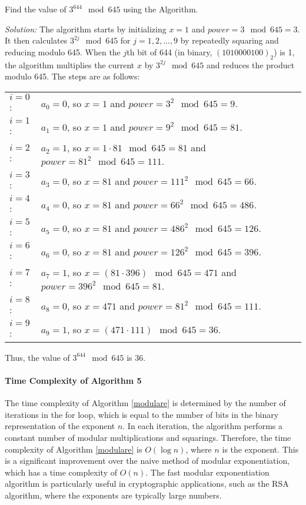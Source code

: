     \begin{example}
        Find the value of $3^{644} \mod 645$ using the Algorithm.
        
        \textit{Solution:} The algorithm starts by initializing $x = 1$ and $power = 3 \mod 645 = 3$. It then calculates
        $3^{2j} \mod 645$ for $j = 1, 2, \ldots, 9$ by repeatedly squaring and reducing modulo 645. When the $j$th bit of 644 
        (in binary, $(1010000100)_2$) is 1, the algorithm multiplies the current $x$ by $3^{2j} \mod 645$ and reduces the product modulo 645. The steps are as follows:
        
        \begin{tabular}{ll}
        $i = 0$: & $a_0 = 0$, so $x = 1$ and $power = 3^2 \mod 645 = 9$. \\
        $i = 1$: & $a_1 = 0$, so $x = 1$ and $power = 9^2 \mod 645 = 81$. \\
        $i = 2$: & $a_2 = 1$, so $x = 1 \cdot 81 \mod 645 = 81$ and $power = 81^2 \mod 645 = 111$. \\
        $i = 3$: & $a_3 = 0$, so $x = 81$ and $power = 111^2 \mod 645 = 66$. \\
        $i = 4$: & $a_4 = 0$, so $x = 81$ and $power = 66^2 \mod 645 = 486$. \\
        $i = 5$: & $a_5 = 0$, so $x = 81$ and $power = 486^2 \mod 645 = 126$. \\
        $i = 6$: & $a_6 = 0$, so $x = 81$ and $power = 126^2 \mod 645 = 396$. \\
        $i = 7$: & $a_7 = 1$, so $x = (81 \cdot 396) \mod 645 = 471$ and $power = 396^2 \mod 645 = 81$. \\
        $i = 8$: & $a_8 = 0$, so $x = 471$ and $power = 81^2 \mod 645 = 111$. \\
        $i = 9$: & $a_9 = 1$, so $x = (471 \cdot 111) \mod 645 = 36$.
        \end{tabular}
        
        Thus, the value of $3^{644} \mod 645$ is 36.
        \end{example}

        \paragraph{Time Complexity of Algorithm 5}
        The time complexity of Algorithm \ref{modulare} is determined by the number of iterations in the for loop, which is equal to the number of 
        bits in the binary representation of the exponent $n$. In each iteration, the algorithm performs a constant number of modular multiplications and 
        squarings. Therefore, the time complexity of Algorithm \ref{modulare} is $O(\log n)$, where $n$ is the exponent. This is a significant improvement over the naive method of modular exponentiation, 
        which has a time complexity of $O(n)$. The fast modular exponentiation algorithm is particularly useful in cryptographic applications, such as the RSA algorithm, 
        where the exponents are typically large numbers.

